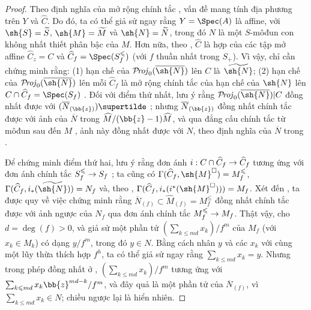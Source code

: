 \documentclass[oneside,10pt]{amsart}
\makeatletter
\renewcommand{\leq}{\leqslant}
\newcommand{\ega@arrow}[2]{\mathchoice{#1}{#2}{#2}{#2}}
\renewcommand{\to}{\ega@arrow{\longrightarrow}{\rightarrow}}
\def\shProj{\mathcal{P}\!\mathit{roj}}
\makeatother
\begin{document}
\begin{proof}
Theo định nghĩa của mở rộng chính tắc , vấn đề mang tính địa phương trên $Y$ và $\widehat{C}$.
Do đó, ta có thể giả sử ngay rằng $Y=\Spec(A)$ là affine, với $\sh{S}=\widetilde{S}$, $\sh{M}=\widetilde{M}$ và $\sh{N}=\widetilde{N}$, trong đó $N$ là một $S$-môđun con không nhất thiết phân bậc của $M$.
Hơn nữa, theo , $\widehat{C}$ là hợp của các tập mở affine $\widehat{C}_z=C$ và $\widehat{C}_f=\Spec(S_f^\leq)$ (với $f$ thuần nhất trong $S_+$).
Vì vậy, chỉ cần chứng minh rằng: (1) hạn chế của $\shProj_0(\overline{\sh{N}})$ lên $C$ là $\widetilde{\sh{N}}$; (2) hạn chế của $\shProj_0(\overline{\sh{N}})$ lên mỗi $\widehat{C}_f$ là mở rộng chính tắc của hạn chế của $\sh{N}$ lên $C\cap\widehat{C}_f=\Spec(S_f)$ .
Đối với điểm thứ nhất, lưu ý rằng $\shProj_0(\overline{\sh{N}})|C$ đồng nhất được với $(\overline{N}_{(\bb{z})})\supertilde$ ;
nhưng $\overline{N}_{(\bb{z})}$ đồng nhất chính tắc được  với ảnh của $\overline{N}$ trong $\widehat{M}/(\bb{z}-1)\widehat{M}$, và qua đẳng cấu chính tắc từ môđun sau đến $M$ , ảnh này đồng nhất được với $N$, theo định nghĩa của $\overline{N}$ trong .

Để chứng minh điểm thứ hai, lưu ý rằng đơn ánh $i:C\cap\widehat{C}_f\to\widehat{C}_f$ tương ứng với đơn ánh chính tắc $S_f^\leq\to S_f$ ;
ta cũng có $\Gamma(\widehat{C}_f,\sh{M}^\square)=M_f^\leq$, $\Gamma(\widehat{C}_f,i_*(\widetilde{\sh{N}}))=N_f$ và, theo , $\Gamma(\widehat{C}_f,i_*(i^*(\sh{M}^\square)))=M_f$.
Xét đến , ta được quy về việc chứng minh rằng $\overline{N}_{(f)}\subset\widehat{M}_{(f)}=M_f^\leq$ đồng nhất chính tắc được với ảnh ngược của $N_f$ qua đơn ánh chính tắc $M_f^\leq\to M_f$.
Thật vậy, cho $d=\deg(f)>0$, và giả sử một phần tử $(\sum_{k\leq md}x_k)/f^m$ của $M_f$ (với $x_k\in M_k$) có dạng $y/f^m$, trong đó $y\in N$.
Bằng cách nhân $y$ và các $x_k$ với cùng một lũy thừa thích hợp $f^h$, ta có thể giả sử ngay rằng $\sum_{k\leq md}x_k=y$.
Nhưng trong phép đồng nhất ở , $(\sum_{k\leq md}x_k)/f^m$ tương ứng với $\sum_{k\leq md}x_k\bb{z}^{md-k}/f^m$, và đây quả là một phần tử của $\overline{N}_{(f)}$, vì $\sum_{k\leq md}x_k\in N$;
chiều ngược lại là hiển nhiên.
\end{proof}
\end{document}
